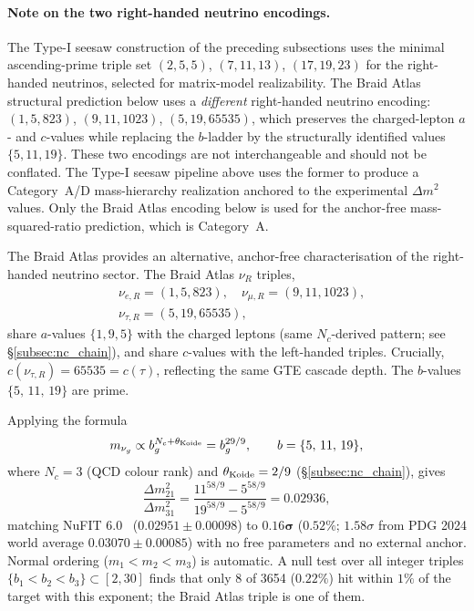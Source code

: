 \documentclass[11pt]{article}
\theoremstyle{remark}
\begin{document}
\paragraph{Note on the two right-handed neutrino encodings.}
The Type-I seesaw construction of the preceding subsections uses the minimal ascending-prime triple set $(2,5,5)$, $(7,11,13)$, $(17,19,23)$ for the right-handed neutrinos, selected for matrix-model realizability.
The Braid Atlas structural prediction below uses a \emph{different} right-handed neutrino encoding: $(1,5,823)$, $(9,11,1023)$, $(5,19,65535)$, which preserves the charged-lepton $a$- and $c$-values while replacing the $b$-ladder by the structurally identified values $\{5,11,19\}$.
These two encodings are not interchangeable and should not be conflated.
The Type-I seesaw pipeline above uses the former to produce a Category~A/D mass-hierarchy realization anchored to the experimental $\Delta m^2$ values.
Only the Braid Atlas encoding below is used for the anchor-free mass-squared-ratio prediction, which is Category~A.

The Braid Atlas provides an alternative, anchor-free characterisation of the right-handed neutrino sector.  The Braid Atlas $\nu_R$ triples,
\begin{align*}
&\nu_{e,R} = (1,5,823),\quad \nu_{\mu,R} = (9,11,1023),\\
&\nu_{\tau,R} = (5,19,65535),
\end{align*}
share $a$-values $\{1,9,5\}$ with the charged leptons (same $N_c$-derived pattern; see \S\ref{subsec:nc_chain}), and share $c$-values with the left-handed triples.  Crucially, $c(\nu_{\tau,R}) = 65535 = c(\tau)$, reflecting the same GTE cascade depth.  The $b$-values $\{5,\,11,\,19\}$ are prime.

Applying the formula
\begin{equation}
m_{\nu_g} \propto b_g^{N_c + \theta_{\rm Koide}} = b_g^{29/9}, \qquad b = \{5,\,11,\,19\},
\label{eq:neutrino_structural}
\end{equation}
where $N_c = 3$ (QCD colour rank) and $\theta_{\rm Koide} = 2/9$ (\S\ref{subsec:nc_chain}), gives
\[
\frac{\Delta m^2_{21}}{\Delta m^2_{31}} = \frac{11^{58/9} - 5^{58/9}}{19^{58/9} - 5^{58/9}} = 0.02936,
\]
matching NuFIT 6.0~\cite{NuFIT60} ($0.02951 \pm 0.00098$) to $\mathbf{0.16\sigma}$ ($0.52\%$; $1.58\sigma$ from PDG 2024 world average $0.03070 \pm 0.00085$) with no free parameters and no external anchor.  Normal ordering ($m_1 < m_2 < m_3$) is automatic.  A null test over all integer triples $\{b_1 < b_2 < b_3\} \subset [2,30]$ finds that only 8 of 3654 ($0.22\%$) hit within $1\%$ of the target with this exponent; the Braid Atlas triple is one of them.
\end{document}
